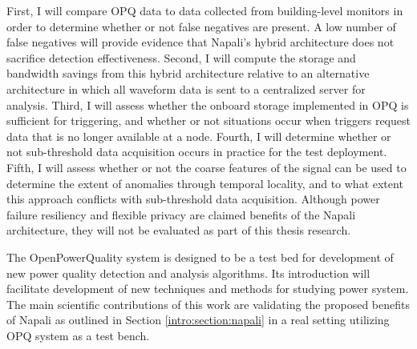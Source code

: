 First, I will compare OPQ data to data collected from building-level monitors in order to determine whether or not false negatives are present.  A low number of false negatives will provide evidence that Napali's hybrid architecture does not sacrifice detection effectiveness.  Second, I will compute the storage and bandwidth savings from this hybrid architecture relative to an alternative architecture in which all waveform data is sent to a centralized server for analysis. Third, I will assess whether the onboard storage implemented in OPQ is sufficient for triggering, and whether or not situations occur when triggers request data that is no longer available at a node. Fourth, I will determine whether or not sub-threshold data acquisition occurs in practice for the test deployment. Fifth, I will assess whether or not the coarse features of the signal can be used to determine the extent of anomalies through temporal locality, and to what extent this approach conflicts with sub-threshold data acquisition. Although power failure resiliency and flexible privacy are claimed benefits of the Napali architecture, they will not be evaluated as part of this thesis research.

The OpenPowerQuality system is designed to be a test bed for development of new power quality detection and analysis algorithms. Its introduction will facilitate development of new techniques and methods for studying power system. The main scientific contributions of this work are validating the proposed benefits of Napali as outlined in Section \ref{intro:section:napali} in a real setting utilizing OPQ system as a test bench.
